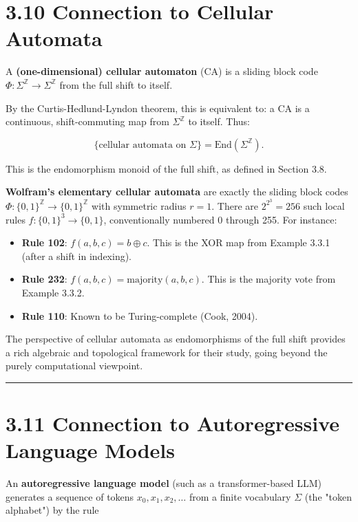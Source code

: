 \section{3.10 Connection to Cellular Automata}

\begin{definition}
A \textbf{(one-dimensional) cellular automaton} (CA) is a sliding block code $\Phi: \Sigma^\mathbb{Z} \to \Sigma^\mathbb{Z}$ from the full shift to itself.

By the Curtis-Hedlund-Lyndon theorem, this is equivalent to: a CA is a continuous, shift-commuting map from $\Sigma^\mathbb{Z}$ to itself. Thus:

\[
\{ \text{cellular automata on } \Sigma\}  = \text{End}(\Sigma^\mathbb{Z}).
\]

This is the endomorphism monoid of the full shift, as defined in Section 3.8.

\textbf{Wolfram's elementary cellular automata} are exactly the sliding block codes $\Phi: \{ 0,1\} ^\mathbb{Z} \to \{ 0,1\} ^\mathbb{Z}$ with symmetric radius $r = 1$. There are $2^{2^3} = 256$ such local rules $f: \{ 0,1\} ^3 \to \{ 0,1\} $, conventionally numbered 0 through 255. For instance:
\end{definition}

\begin{itemize}
  \item \textbf{Rule 102}: $f(a,b,c) = b \oplus c$. This is the XOR map from Example 3.3.1 (after a shift in indexing).
  \item \textbf{Rule 232}: $f(a,b,c) = \text{majority}(a,b,c)$. This is the majority vote from Example 3.3.2.
  \item \textbf{Rule 110}: Known to be Turing-complete (Cook, 2004).
\end{itemize}

The perspective of cellular automata as endomorphisms of the full shift provides a rich algebraic and topological framework for their study, going beyond the purely computational viewpoint.

\bigskip\hrule\bigskip

\section{3.11 Connection to Autoregressive Language Models}

An \textbf{autoregressive language model} (such as a transformer-based LLM) generates a sequence of tokens $x_0, x_1, x_2, \ldots$ from a finite vocabulary $\Sigma$ (the "token alphabet") by the rule

